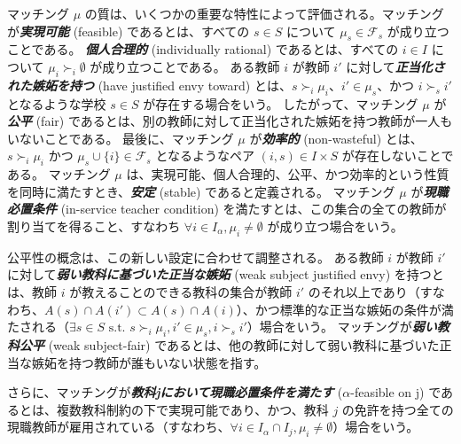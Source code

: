 \documentclass[12pt, a4paper]{article}
\theoremstyle{definition}
\theoremstyle{remark}
\theoremstyle{plain}
\begin{document}
マッチング $\mu$ の質は、いくつかの重要な特性によって評価される。マッチングが\textbf{\textit{実現可能}} (feasible) であるとは、すべての $s \in S$ について $\mu_s \in \mathcal{F}_s$ が成り立つことである。
\textbf{\textit{個人合理的}} (individually rational) であるとは、すべての $i \in I$ について $\mu_i \succ_i \emptyset$ が成り立つことである。
ある教師 $i$ が教師 $i'$ に対して\textbf{\textit{正当化された嫉妬を持つ}} (have justified envy toward) とは、$s \succ_i \mu_i$、$i' \in \mu_s$、かつ $i \succ_s i'$ となるような学校 $s \in S$ が存在する場合をいう。
したがって、マッチング $\mu$ が\textbf{\textit{公平}} (fair) であるとは、別の教師に対して正当化された嫉妬を持つ教師が一人もいないことである。
最後に、マッチング $\mu$ が\textbf{\textit{効率的}} (non-wasteful) とは、$s \succ_i \mu_i$ かつ $\mu_s \cup \{i\} \in \mathcal{F}_s$ となるようなペア $(i, s) \in I \times S$ が存在しないことである。
マッチング $\mu$ は、実現可能、個人合理的、公平、かつ効率的という性質を同時に満たすとき、\textbf{\textit{安定}} (stable) であると定義される。
マッチング $\mu$ が\textbf{\textit{現職必置条件}} (in-service teacher condition) を満たすとは、この集合の全ての教師が割り当てを得ること、すなわち $\forall i \in I_{\alpha}, \mu_i \neq \emptyset$ が成り立つ場合をいう。


公平性の概念は、この新しい設定に合わせて調整される。
ある教師 $i$ が教師 $i'$ に対して\textbf{\textit{弱い教科に基づいた正当な嫉妬}} (weak subject justified envy) を持つとは、教師 $i$ が教えることのできる教科の集合が教師 $i'$ のそれ以上であり（すなわち、$A(s) \cap A(i') \subset A(s) \cap A(i)$）、かつ標準的な正当な嫉妬の条件が満たされる（$\exists s \in S \text{ s.t. } s \succ_i \mu_i, i' \in \mu_s, i \succ_s i'$）場合をいう。
マッチングが\textbf{\textit{弱い教科公平}} (weak subject-fair) であるとは、他の教師に対して弱い教科に基づいた正当な嫉妬を持つ教師が誰もいない状態を指す。

さらに、マッチングが\textbf{\textit{教科jにおいて現職必置条件を満たす}} ($\alpha$-feasible on j) であるとは、複数教科制約の下で実現可能であり、かつ、教科 $j$ の免許を持つ全ての現職教師が雇用されている（すなわち、$\forall i \in I_\alpha \cap I_j, \mu_i \neq \emptyset$）場合をいう。

\end{document}
